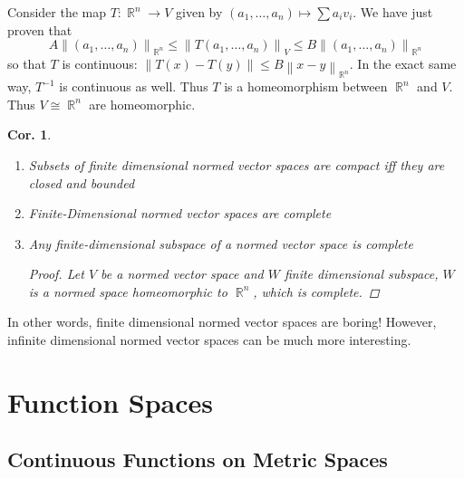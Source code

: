 \documentclass[12pt, a4paper]{book}
\DeclareMathOperator{\R}{\mathbb{R}}
\newcommand{\norm}[1]{\left\lVert#1\right\rVert} %
\newtheorem{corollary}[theorem]{Cor.}
\theoremstyle{nonumberplain}
\newtheorem{proof}{Proof}
\begin{document}
Consider the map $T:\R^n\to V$ given by $(a_1,\ldots,a_n)\mapsto\sum a_iv_i$. We have just proven that
\[A\norm{(a_1,\ldots,a_n)}_{\R^n}\leq\norm{T(a_1,\ldots,a_n)}_V\leq B\norm{(a_1,\ldots,a_n)}_{\R^n}\]
so that $T$ is continuous: $\norm{T(x)-T(y)}\leq B\norm{x-y}_{\R^n}$. In the exact same way, $T^{-1}$ is continuous as
well. Thus $T$ is a homeomorphism between $\R^n$ and $V$. Thus $V\cong\R^n$ are homeomorphic.
\begin{corollary}
    \begin{enumerate}
        \item Subsets of finite dimensional normed vector spaces are compact iff they are closed and bounded
        \item Finite-Dimensional normed vector spaces are complete
        \item Any finite-dimensional subspace of a normed vector space is complete
            \begin{proof}
                Let $V$ be a normed vector space and $W$ finite dimensional subspace, $W$ is a normed space homeomorphic
                to $\R^n$, which is complete.
            \end{proof}
    \end{enumerate}
\end{corollary}
In other words, finite dimensional normed vector spaces are boring! However, infinite dimensional normed vector spaces
can be much more interesting.
\chapter{Function Spaces}
\section{Continuous Functions on Metric Spaces}
\end{document}
